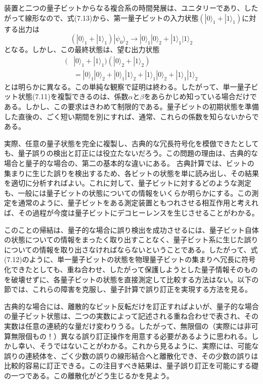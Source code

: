 装置と二つの量子ビットからなる複合系の時間発展は、ユニタリーであり、したがって線形なので、式(7.13)から、第一量子ビットの入力状態$(|0\rangle_1+|1\rangle_1)$に対する出力は
\begin{equation}(|0\rangle_1+|1\rangle_1)|\psi_0\rangle_2\longrightarrow|0\rangle_1|0\rangle_2+|1\rangle_1|1\rangle_2\tag{7.14}\end{equation}
となる。しかし、この最終状態は、望む出力状態
\begin{equation}\begin{aligned}(&|0\rangle_1+|1\rangle_1)(|0\rangle_2+|1\rangle_2)\\&=|0\rangle_1|0\rangle_2+|0\rangle_1|1\rangle_2+|1\rangle_1|0\rangle_2+|1\rangle_1|1\rangle_2\end{aligned}\tag{7.15}\end{equation}
とは明らかに異なる。この単純な観察で証明は終わる。したがって、単一量子ビット状態(7.11)を複製できるのは、係数$\alpha$と$\beta$をあらかじめ知っている場合だけである。しかし、この要求はきわめて制限的である。量子ビットの初期状態を準備した直後の、ごく短い期間を別にすれば、通常、これらの係数を知らないからである。

実際、任意の量子状態を完全に複製し、古典的な冗長符号化を模倣できたとしても、量子誤りの検出と訂正には役立たないだろう。この問題の理由は、古典的な場合と量子的な場合の、第二の基本的な違いにある。
\hypertarget{srcpage:307}{}\label{srcpage:307}
古典計算では、ビットの集まりに生じた誤りを検出するため、各ビットの状態を単に読み出し、その結果を適切に分析すればよい。これに対して、量子ビットに対するどのような測定も、一般には量子ビットの状態についての情報をいくらか明らかにする。この測定を通常のように、量子ビットをある測定装置ともつれさせる相互作用と考えれば、その過程が今度は量子ビットにデコヒーレンスを生じさせることがわかる。

このことの帰結は、量子的な場合に誤り検出を成功させるには、量子ビット自体の状態についての情報をまったく取り出すことなく、量子ビット系に生じた誤りについての情報を取り出さなければならないということである。したがって、式(7.12)のように、単一量子ビットの状態を物理量子ビットの集まりへ冗長に符号化できたとしても、重ね合わせ、したがって保護しようとした量子情報そのものを破壊せずに、各量子ビットの状態を直接測定して比較する方法はない。以下の節では、これらの障害を克服し、量子計算で誤り訂正を実現する方法を見る。

古典的な場合には、離散的なビット反転だけを訂正すればよいが、量子的な場合の量子ビット状態は、二つの実数によって記述される重ね合わせで表され、その実数は任意の連続的な量だけ変わりうる。したがって、無限個の（実際には非可算無限個もの！）異なる誤り訂正操作を用意する必要があるように思われる。しかし幸い、そうではないことがわかる。これから見るように、実際には、可能な誤りの連続体を、ごく少数の誤りの線形結合へと離散化でき、その少数の誤りは比較的容易に訂正できる。この注目すべき結果は、量子誤り訂正を可能にする礎の一つである。この離散化がどう生じるかを見よう。

